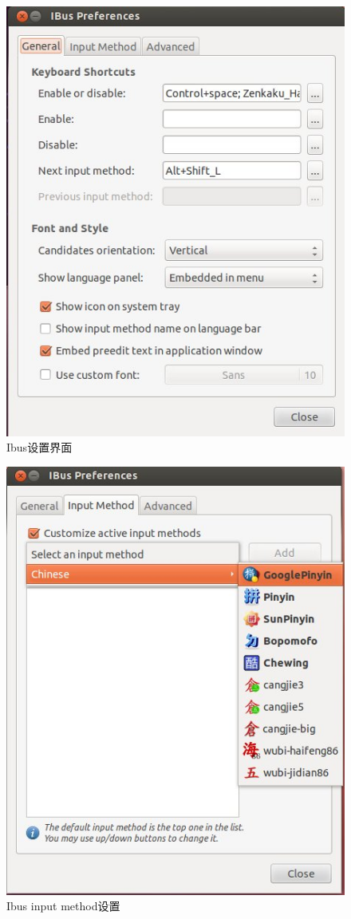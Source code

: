\documentclass{book}
\begin{document}
\begin{figure}[htbp]
		\centering
		\includegraphics[scale=0.7]{IbusSetup.jpeg}
		\caption{Ibus设置界面}
		\label{IbusSetup}
	\end{figure}
	
	\begin{figure}[htbp]
		\centering
		\includegraphics[scale=0.7]{IbusSetupGooglePinyin.jpeg}
		\caption{Ibus input method设置}
		\label{IbusSetupGooglePinyin}
	\end{figure}
		
\end{document}
